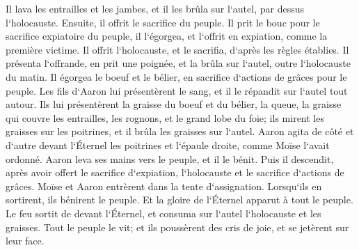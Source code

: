 \verse Il lava les entrailles et les jambes, et il les brûla sur l`autel, par dessus l`holocauste. 
\verse Ensuite, il offrit le sacrifice du peuple. Il prit le bouc pour le sacrifice expiatoire du peuple, il l`égorgea, et l`offrit en expiation, comme la première victime. 
\verse Il offrit l`holocauste, et le sacrifia, d`après les règles établies. 
\verse Il présenta l`offrande, en prit une poignée, et la brûla sur l`autel, outre l`holocauste du matin. 
\verse Il égorgea le boeuf et le bélier, en sacrifice d`actions de grâces pour le peuple. Les fils d`Aaron lui présentèrent le sang, et il le répandit sur l`autel tout autour. 
\verse Ils lui présentèrent la graisse du boeuf et du bélier, la queue, la graisse qui couvre les entrailles, les rognons, et le grand lobe du foie; 
\verse ils mirent les graisses sur les poitrines, et il brûla les graisses sur l`autel. 
\verse Aaron agita de côté et d`autre devant l`Éternel les poitrines et l`épaule droite, comme Moïse l`avait ordonné. 
\verse Aaron leva ses mains vers le peuple, et il le bénit. Puis il descendit, après avoir offert le sacrifice d`expiation, l`holocauste et le sacrifice d`actions de grâces. 
\verse Moïse et Aaron entrèrent dans la tente d`assignation. Lorsqu`ils en sortirent, ils bénirent le peuple. Et la gloire de l`Éternel apparut à tout le peuple. 
\verse Le feu sortit de devant l`Éternel, et consuma sur l`autel l`holocauste et les graisses. Tout le peuple le vit; et ils poussèrent des cris de joie, et se jetèrent sur leur face. 


